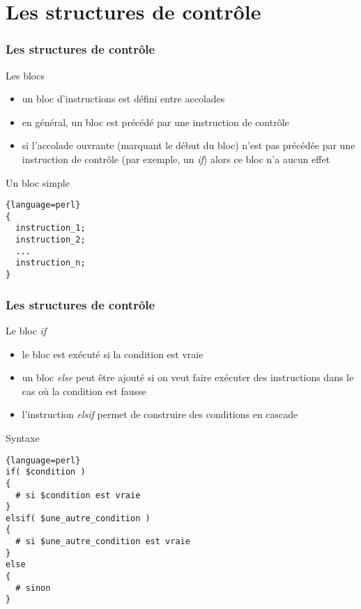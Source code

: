 \section{Les structures de contrôle}

\begin{frame}[fragile]
  \frametitle{Les structures de contrôle}

  \begin{block}{Les blocs}
    \begin{itemize}
    \item un bloc d'instructions est défini entre accolades
    \item en général, un bloc est précédé par une instruction de contrôle
    \item si l'accolade ouvrante (marquant le début du bloc) n'est pas
      précédée par une instruction de contrôle (par exemple, un \textit{if})
      alors ce bloc n'a aucun effet
    \end{itemize}
  \end{block}

  \begin{exampleblock}{Un bloc simple}
    \begin{lstlisting}{language=perl}
{
  instruction_1;
  instruction_2;
  ...
  instruction_n;
}
    \end{lstlisting}
  \end{exampleblock}

\end{frame}

\begin{frame}[fragile]
  \frametitle{Les structures de contrôle}

  \begin{block}{Le bloc \textit{if}}
    \begin{itemize}
    \item le bloc est exécuté si la condition est vraie
    \item un bloc \textit{else} peut être ajouté si on veut faire exécuter
      des instructions dans le cas où la condition est fausse
    \item l'instruction \textit{elsif} permet de construire des conditions
      en cascade
    \end{itemize}
  \end{block}

  \begin{alertblock}{Syntaxe}
    \begin{lstlisting}{language=perl}
if( $condition )
{
  # si $condition est vraie
}
elsif( $une_autre_condition )
{
  # si $une_autre_condition est vraie
}
else
{
  # sinon
}
    \end{lstlisting}
  \end{alertblock}

\end{frame}

